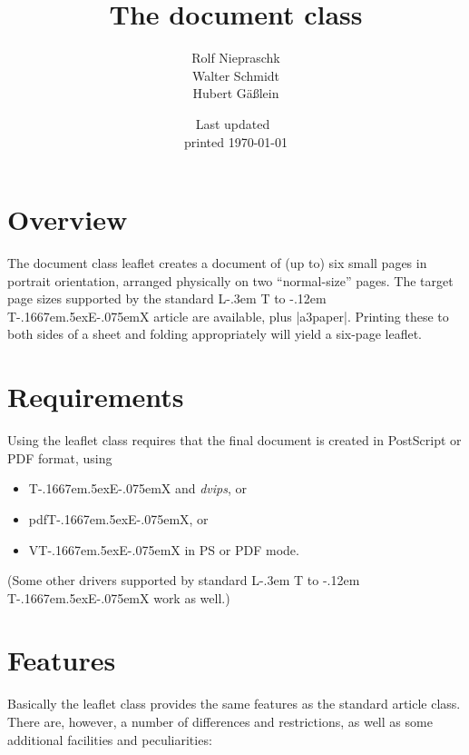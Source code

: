 \documentclass[
]{leaflet}
\title{The document class \Lclass{leaflet}}
\author{%
  Rolf Niepraschk\\
  Walter Schmidt\\
  Hubert G\"a\ss lein}
\date{Last updated~\docdate\\printed \today}
\makeatletter
\def\ptmTeX{T\kern-.1667em\lower.5ex\hbox{E}\kern-.075emX\@}
\DeclareRobustCommand{\ptmLaTeX}{L\kern-.3em
        {\setbox0\hbox{T}%
         \vbox to\ht0{\hbox{%
                            \csname S@\f@size\endcsname
                            \fontsize\sf@size\z@
                            \math@fontsfalse\selectfont
                            A}%
                      \vss}%
        }%
        \kern-.12em
        \ptmTeX}
\let\TeX=\ptmTeX
\let\LaTeX=\ptmLaTeX
\newcommand\Lclass[1]{\textsf{#1}}
\newcommand\Lprog[1]{\textit{#1}}
\makeatother
\begin{document}
\maketitle
\thispagestyle{empty}



\section{Overview}

The document class \Lclass{leaflet} creates a document of (up to) six
small pages in portrait orientation, arranged physically on two
``normal-size'' pages. The target page sizes supported by the standard
\LaTeX{}  \Lclass{article} are available, plus |a3paper|. Printing these
to both sides of a sheet and folding appropriately will yield a six-page
leaflet.

\onecolumn
\twocolumn[WWW]

\section{Requirements}

Using the \Lclass{leaflet} class requires that the final
document is created in PostScript or PDF format, using
\begin{itemize}
  \item \TeX{} and \Lprog{dvips}, or
  \item pdf\TeX{}, or
  \item V\TeX{} in PS or PDF mode.
\end{itemize}
(Some other drivers supported by standard \LaTeX{} work as well.)

\section{Features}

Basically the \Lclass{leaflet} class provides the same features as the
standard \Lclass{article} class. There are, however, a number of
differences and restrictions, as well as some additional facilities and
peculiarities:
\end{document}
